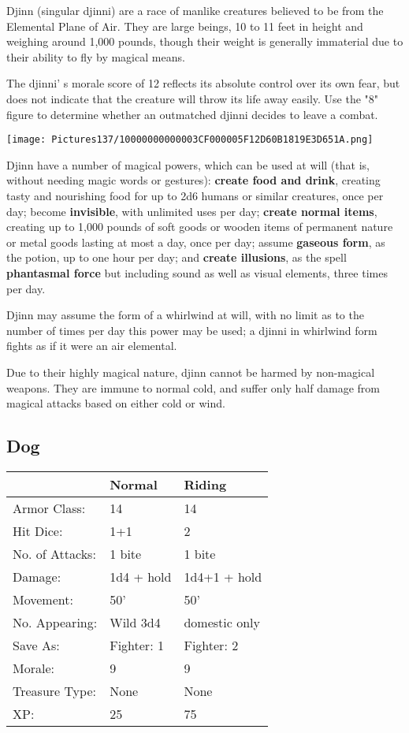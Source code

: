 \documentclass[a4paper,twoside,openany,10pt]{book}
\begin{document}
\begin{multicols}{2}
Djinn (singular djinni) are a race of manlike creatures believed to be from the Elemental Plane of Air. They are large beings, 10 to 11 feet in height and weighing around 1,000 pounds, though their weight is generally immaterial due to their ability to fly by magical means.

The djinni' s morale score of 12 reflects its absolute control over its own fear, but does not indicate that the creature will throw its life away easily. Use the "8" figure to determine whether an outmatched djinni decides to leave a combat.


\begin{center}
	\texttt{[image: Pictures137/10000000000003CF000005F12D60B1819E3D651A.png]}
\end{center}

Djinn have a number of magical powers, which can be used at will (that is, without needing magic words or gestures): \textbf{create food and drink}, creating tasty and nourishing food for up to 2d6 humans or similar creatures, once per day; become \textbf{invisible}, with unlimited uses per day; \textbf{create normal items}, creating up to 1,000 pounds of soft goods or wooden items of permanent nature or metal goods lasting at most a day, once per day; assume \textbf{gaseous form}, as the potion, up to one hour per day; and \textbf{create illusions}, as the spell \textbf{phantasmal force} but including sound as well as visual elements, three times per day.

Djinn may assume the form of a whirlwind at will, with no limit as to the number of times per day this power may be used; a djinni in whirlwind form fights as if it were an air elemental.

Due to their highly magical nature, djinn cannot be harmed by non-magical weapons. They are immune to normal cold, and suffer only half damage from magical attacks based on either cold or wind.

\subsection*{Dog}\label{dog}

\begin{tabularx}{0.48\textwidth}{lXX}
& Normal & Riding \\\hline
Armor Class: & 14 & 14 \\\hline
Hit Dice: & 1+1 & 2 \\\hline
No. of Attacks: & 1 bite & 1 bite \\\hline
Damage: & 1d4 + hold & 1d4+1 + hold \\\hline
Movement: & 50' & 50' \\\hline
No. Appearing: & Wild 3d4 & domestic only \\\hline
Save As: & Fighter: 1 & Fighter: 2 \\\hline
Morale: & 9 & 9 \\\hline
Treasure Type: & None & None \\\hline
XP: & 25 & 75 \\\hline
\end{tabularx}\medskip


\end{multicols}
\end{document}
